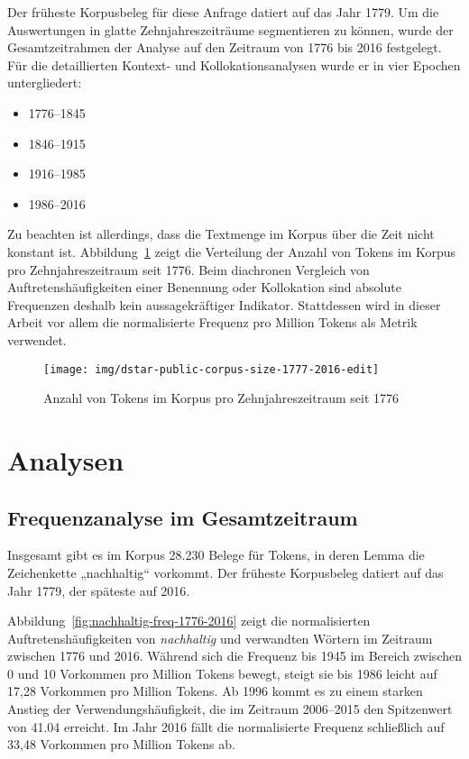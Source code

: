 \documentclass[
    german,
    a4paper,%
    12pt,%
    oneside,%
    toc=bibliography,
    final,
]{scrartcl}
\begin{document}
Der früheste Korpusbeleg für diese Anfrage datiert auf das Jahr 1779. Um die Auswertungen in glatte Zehnjahreszeiträume segmentieren zu können, wurde der Gesamtzeitrahmen der Analyse auf den Zeitraum von 1776 bis 2016 festgelegt. Für die detaillierten Kontext- und Kollokationsanalysen wurde er in vier Epochen untergliedert:

\begin{itemize}
\item 1776–1845
\item 1846–1915
\item 1916–1985
\item 1986–2016
\end{itemize}

Zu beachten ist allerdings, dass die Textmenge im Korpus über die Zeit nicht konstant ist. Abbildung~\ref{fig:corpus-size} zeigt die Verteilung der Anzahl von Tokens im Korpus pro Zehnjahreszeitraum seit 1776. Beim diachronen Vergleich von Auftretenshäufigkeiten einer Benennung oder Kollokation sind absolute Frequenzen deshalb kein aussagekräftiger Indikator. Stattdessen wird in dieser Arbeit vor allem die normalisierte Frequenz pro Million Tokens als Metrik verwendet.

\begin{figure}[h!]
\centering
\texttt{[image: img/dstar-public-corpus-size-1777-2016-edit]}
\caption[corpus-size]{Anzahl von Tokens im Korpus pro Zehnjahreszeitraum seit 1776\footnotemark}
\label{fig:corpus-size}
\end{figure}


\section{Analysen}
\label{sec:analysen}


\subsection{Frequenzanalyse im Gesamtzeitraum}
\label{subsec:freq-gesamt}

Insgesamt gibt es im Korpus 28.230 Belege für Tokens, in deren Lemma die Zeichenkette „nachhaltig“ vorkommt. Der früheste Korpusbeleg datiert auf das Jahr 1779, der späteste auf 2016.

Abbildung~\ref{fig:nachhaltig-freq-1776-2016} zeigt die normalisierten Auftretenshäufigkeiten von \textit{nachhaltig} und verwandten Wörtern im Zeitraum zwischen 1776 und 2016. Während sich die Frequenz bis 1945 im Bereich zwischen 0 und 10 Vorkommen pro Million Tokens bewegt, steigt sie bis 1986 leicht auf 17,28 Vorkommen pro Million Tokens. Ab 1996 kommt es zu einem starken Anstieg der Verwendungshäufigkeit, die im Zeitraum 2006–2015 den Spitzenwert von 41.04 erreicht. Im Jahr 2016 fällt die normalisierte Frequenz schließlich auf 33,48 Vorkommen pro Million Tokens ab.
\end{document}
